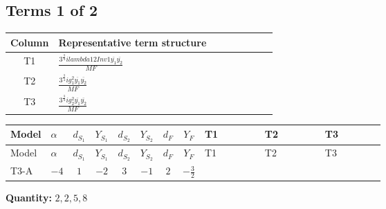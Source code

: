 \documentclass[8pt]{article}
\begin{document}
\begin{landscape}
\subsection*{Terms 1 of 2}
\begin{center}
\begin{tabular}{@{}c >{\raggedright\arraybackslash}p{0.82\linewidth}@{}}
\toprule
Column & Representative term structure \\
\midrule
T1 & \(\displaystyle \frac{3^{\frac{3}{4}} i lambda12Inv1 \overline{y_{1}} \overline{y_{2}}}{MF}\) \\
\midrule
T2 & \(\displaystyle \frac{3^{\frac{3}{4}} i g_{1}^{2} \overline{y_{1}} \overline{y_{2}}}{MF}\) \\
\midrule
T3 & \(\displaystyle \frac{3^{\frac{3}{4}} i g_{2}^{2} \overline{y_{1}} \overline{y_{2}}}{MF}\) \\
\midrule
\bottomrule
\end{tabular}
\end{center}
\smallskip
\tiny
\begin{longtable}{@{}llcccccc >{\raggedright\arraybackslash}p{0.21\linewidth} >{\raggedright\arraybackslash}p{0.21\linewidth} >{\raggedright\arraybackslash}p{0.21\linewidth}@{}}
\toprule
Model & $\alpha$ & $d_{S_1}$ & $Y_{S_1}$ & $d_{S_2}$ & $Y_{S_2}$ & $d_F$ & $Y_F$ & T1 & T2 & T3 \\
\midrule
\endfirsthead
\toprule
Model & $\alpha$ & $d_{S_1}$ & $Y_{S_1}$ & $d_{S_2}$ & $Y_{S_2}$ & $d_F$ & $Y_F$ & T1 & T2 & T3 \\
\midrule
\endhead
T3-A & $-4$ & $1$ & $-2$ & $3$ & $-1$ & $2$ & $-\frac{3}{2}$ & \scriptsize\adjustbox{max width=\linewidth}{$\begin{gathered} \frac{3^{\frac{3}{4}} i lambda12Inv1 \overline{y_{1}} \overline{y_{2}}}{6 MF}\end{gathered}$} & \scriptsize\adjustbox{max width=\linewidth}{$\begin{gathered} \frac{9 \cdot 3^{\frac{3}{4}} i g_{1}^{2} \overline{y_{1}} \overline{y_{2}}}{8 MF}\end{gathered}$} & \scriptsize\adjustbox{max width=\linewidth}{$\begin{gathered} \frac{17 \cdot 3^{\frac{3}{4}} i g_{2}^{2} \overline{y_{1}} \overline{y_{2}}}{24 MF}\end{gathered}$} \\
\midrule
\bottomrule
\end{longtable}
\clearpage
\noindent\textbf{Quantity: }$\mathrm{2,2,5,8}$\par\smallskip

\end{landscape}
\end{document}
